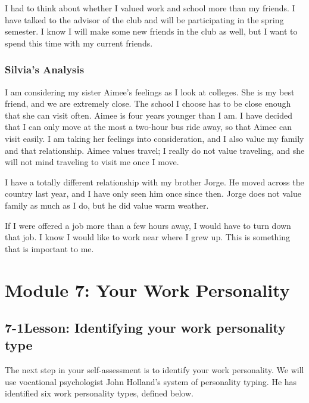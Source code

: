 I had to think about whether I valued work and school more than my friends. I have talked to the advisor of the club and will be participating in the spring semester. I know I will make some new friends in the club as well, but I want to spend this time with my current friends.
 
\subsubsection*{Silvia's Analysis}
I am considering my sister Aimee's feelings as I look at colleges. She is my best friend, and we are extremely close. The school I choose has to be close enough that she can visit often. Aimee is four years younger than I am. I have decided that I can only move at the most a two-hour bus ride away, so that Aimee can visit easily. I am taking her feelings into consideration, and I also value my family and that relationship. Aimee values travel; I really do not value traveling, and she will not mind traveling to visit me once I move.

I have a totally different relationship with my brother Jorge. He moved across the country last year, and I have only seen him once since then. Jorge does not value family as much as I do, but he did value warm weather.

If I were offered a job more than a few hours away, I would have to turn down that job. I know I would like to work near where I grew up. This is something that is important to me.

 
\pagebreak \section*{Module 7:	Your Work Personality}
\noindent\makebox[\textwidth]{\rule{\linewidth}{0.4pt}} 
\localtableofcontents 
\noindent\makebox[\textwidth]{\rule{\linewidth}{0.4pt}} 


\pagebreak \subsection*{7-1\quad Lesson: Identifying your work personality type}
The next step in your self-assessment is to identify your work personality. We will use vocational psychologist John Holland's system of personality typing. He has identified six work personality types, defined below.

